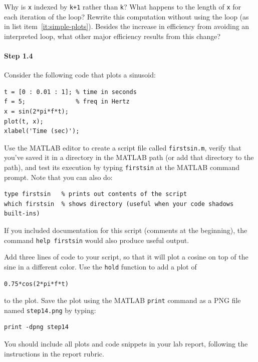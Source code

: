 Why is \verb|x| indexed by \verb|k+1| rather than \verb|k|? What
happens to the length of \verb|x| for each iteration of the loop?
Rewrite this computation without using the loop (as in list
item~\ref{it:simple-plots}). Besides the increase in efficiency from
avoiding an interpreted loop, what other major efficiency results from
this change?

\paragraph{Step 1.4} Consider the following code that plots a
sinusoid:
\begin{lstlisting}[style=Matlab-editor,basicstyle=\mlttfamily\small]
t = [0 : 0.01 : 1]; % time in seconds
f = 5;              % freq in Hertz
x = sin(2*pi*f*t);
plot(t, x);
xlabel('Time (sec)');
\end{lstlisting}

Use the MATLAB editor to create a script file called
\texttt{firstsin.m}, verify that you've saved it in a directory in the
MATLAB path (or add that directory to the path), and test its
execution by typing \texttt{firstsin} at the MATLAB command
prompt. Note that you can also do:
\begin{lstlisting}[style=Matlab-editor,basicstyle=\mlttfamily\small]
type firstsin   % prints out contents of the script
which firstsin  % shows directory (useful when your code shadows built-ins)
\end{lstlisting}

If you included documentation for this script (comments at the
beginning), the command \verb|help firstsin| would also produce useful
output.

Add three lines of code to your script, so that it will plot a cosine
on top of the sine in a different color. Use the \texttt{hold}
function to add a plot of
\begin{lstlisting}[style=Matlab-editor,basicstyle=\mlttfamily\small]
0.75*cos(2*pi*f*t)
\end{lstlisting}

to the plot. Save the plot using the MATLAB \texttt{print} command as
a PNG file named \texttt{step14.png} by typing:
\begin{lstlisting}[style=Matlab-editor,basicstyle=\mlttfamily\small]
print -dpng step14
\end{lstlisting}

You should include all plots and code snippets in your lab report,
following the instructions in the report rubric.


